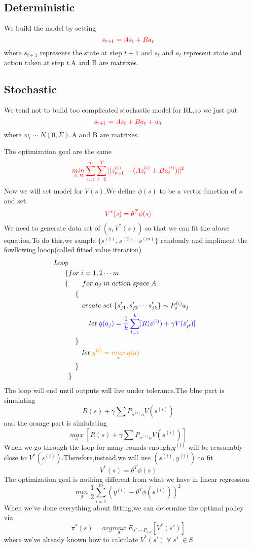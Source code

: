 \documentclass{article}
\begin{document}
\subsection{Deterministic}
We build the model by setting$$\textcolor{red}{s_{t+1}=As_t+Ba_t}$$where $s_{t+1}$ represents the state at step $t+1$ and $s_t$ and $a_t$ represent state and action taken at step $t$.A and B are matrixes.
\subsection{Stochastic}
We tend not to build too complicated stochastic model for RL,so we just put$$\textcolor{red}{s_{t+1}=As_t+Ba_t+w_t}$$where $w_t\sim N(0,\Sigma)$.A and B are matrixes.

The optimization goal are the same$$\textcolor{red}{\underset{A,B}{min}\sum_{i=1}^{m}\sum_{t=0}^{T}||s^{(i)}_{t+1}-(As^{(i)}_t+Ba^{(i)}_t)||^2}$$
Now we will set model for $V(s)$.We define $\phi(s)$ to be a vector function of $s$ and set$$\textcolor{red}{V^{*}(s)=\theta^{T}\phi(s)}$$We need to generate data set of $(s,V^{*}(s))$ so that we can fit the above equation.To do this,we sample $\{s^{(1)},s^{(2)}\cdots s^{(m)}\}$ randomly and impliment the fowllowing looop(called fitted value iteration)
\begin{align*}
	Loop\\ \{
	 &for\;i=1,2\cdots m\\ \{
	&\quad\quad for\;a_j\;in\;action\;space\;A\\ &\quad\{\\
	&\qquad create \;set\;\{s_{j1}',s_{j2}'\cdots s_{jk}'\}\sim {P_s^{(i)}a_j}\\
	&\quad\qquad let\;\textcolor{blue}{q(a_j)=\frac{1}{k}\sum_{l=1}^{k}[R(s^{(i)})+\gamma V(s_{jl}')]}\\&\quad\}\\&\qquad let\; \textcolor{orange}{y^{(i)}=\underset{a}{max}\;q(a)}\\&\quad
\}\\&\}
\end{align*}
The loop will end until outputs will live under tolerance.The blue part is simulating$$R(s)+\gamma\sum P_{s^{(i)}a}V(s^{(i)})$$and the orange part is simlulating$$\underset{a}{max}\;[R(s)+\gamma\sum P_{s^{(i)}a}V(s^{(i)})]$$When we go through the loop for many rounds enough,$y^{(i)}$ will be reasonably close to $V^{*}(s^{(i)})$.Therefore,instead,we will use $(s^{(i)},y^{(i)})$ to fit$$V^{*}(s)=\theta^T\phi(s)$$The optimization goal is nothing different from what we have in linear regression$$\underset{\theta}{min}\;\frac{1}{2}\sum_{i=1}^{m}(y^{(i)}-\theta^T\phi(s^{(i)}))^2$$
When we've done everything about fitting,we can determine the optimal policy via$$\pi^*(s)=arg\underset{a}{max}\;E_{s'\sim P_{s,a}}[V^*(s')]$$where we've already known how to calculate $V^*(s')\;\forall\;s'\;\in S$
\end{document}
